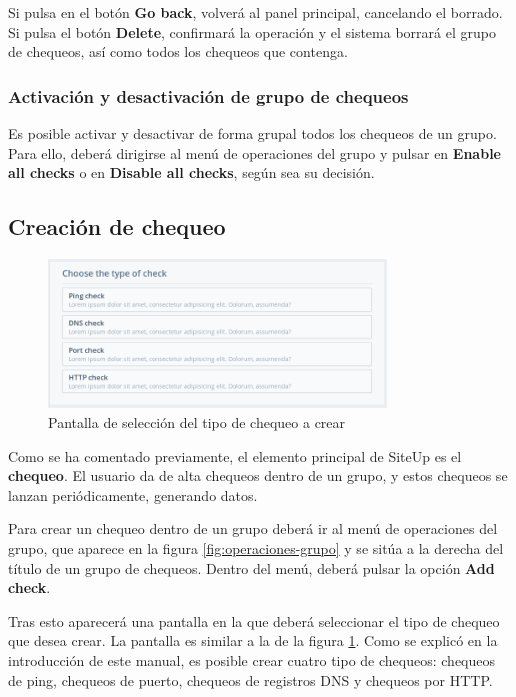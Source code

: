 Si pulsa en el botón \textbf{Go back}, volverá al panel principal, cancelando el
borrado. Si pulsa el botón \textbf{Delete}, confirmará la operación y el sistema
borrará el grupo de chequeos, así como todos los chequeos que contenga.

\subsubsection{Activación y desactivación de grupo de chequeos}

Es posible activar y desactivar de forma grupal todos los chequeos de un
grupo. Para ello, deberá dirigirse al menú de operaciones del grupo y pulsar en
\textbf{Enable all checks} o en \textbf{Disable all checks}, según sea su decisión.

\subsection{Creación de chequeo}

\begin{figure}[hbtp]
  \centering
  \includegraphics[width=0.8\textwidth]{apendice_manual_usuario/pantalla_seleccion_tipo.png}
  \caption{Pantalla de selección del tipo de chequeo a crear}
  \label{fig:seleccionar-tipo-check}
\end{figure}

Como se ha comentado previamente, el elemento principal de SiteUp es el
\textbf{chequeo}. El usuario da de alta chequeos dentro de un grupo, y estos
chequeos se lanzan periódicamente, generando datos.

Para crear un chequeo dentro de un grupo deberá ir al menú de operaciones del
grupo, que aparece en la figura \ref{fig:operaciones-grupo} y se sitúa a la
derecha del título de un grupo de chequeos. Dentro del menú, deberá pulsar la
opción \textbf{Add check}.



Tras esto aparecerá una pantalla en la que deberá seleccionar el tipo de chequeo
que desea crear. La pantalla es similar a la de la figura
\ref{fig:seleccionar-tipo-check}. Como se explicó en la introducción de este
manual, es posible crear cuatro tipo de chequeos: chequeos de ping, chequeos de
puerto, chequeos de registros DNS y chequeos por HTTP.

